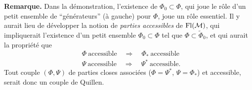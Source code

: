 \textbf{Remarque.} Dans la démonstration, l'existence de $\Phi_0\subset\Phi$, qui joue le rôle d'un petit ensemble de “générateurs” (à gauche) pour $\Phi$, joue un rôle essentiel. Il y aurait lieu de développer la notion de \textit{parties accessibles}
de $\mathrm{Fl}(\mathcal{M})$, qui impliquerait l'existence d'un petit ensemble $\Phi_0\subset\Phi$ tel que $\Phi\subset\widetilde{\Phi}_0$, et qui aurait la propriété que
\[
\begin{aligned}
&\Phi\ \text{accessible}\quad\Longrightarrow\quad\Phi_*\ \text{accessible}\\
&\Psi\ \text{accessible}\quad\Longrightarrow\quad\Psi^*\ \text{accessible.}
\end{aligned}
\]
Tout couple $(\Phi,\Psi)$ de parties closes associées ($\Phi=\Psi^*$, $\Psi=\Phi_*$) et accessible, serait donc un couple de Quillen.

